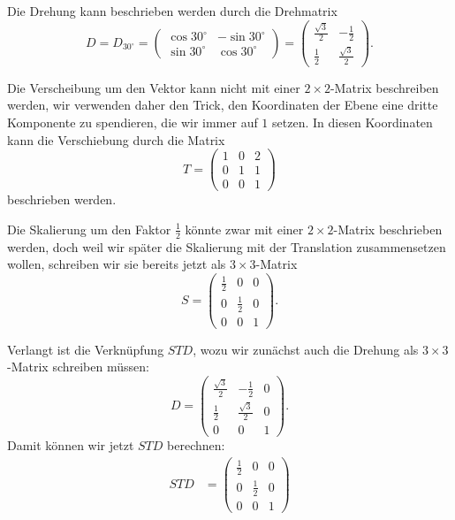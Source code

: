 \begin{loesung}
\begin{teilaufgaben}
\item
Die Drehung kann beschrieben werden durch die Drehmatrix
\[
D=D_{30^\circ}
=
\begin{pmatrix}
\cos 30^\circ & -\sin 30^\circ \\
\sin 30^\circ &  \cos 30^\circ
\end{pmatrix}
=
\begin{pmatrix}
\frac{\sqrt{3}}2 & - \frac12\\
\frac12 & \frac{\sqrt{3}}2
\end{pmatrix}.
\]
\item
Die Verscheibung um den Vektor kann nicht mit einer $2\times 2$-Matrix
beschreiben werden, wir verwenden daher den Trick, den Koordinaten der
Ebene eine dritte Komponente zu spendieren, die wir immer auf $1$ setzen.
In diesen Koordinaten kann die Verschiebung durch die Matrix
\[
T=
\begin{pmatrix}
1&0&2\\
0&1&1\\
0&0&1
\end{pmatrix}
\]
beschrieben werden.
\item
Die Skalierung um den Faktor $\frac12$ könnte zwar mit einer $2\times 2$-Matrix
beschrieben werden, doch weil wir später die Skalierung mit der Translation
zusammensetzen wollen, schreiben wir sie bereits jetzt als $3\times 3$-Matrix
\[
S
=
\begin{pmatrix}
\frac12 &     0   & 0 \\
    0   & \frac12 & 0 \\
    0   &     0   & 1 
\end{pmatrix}
.
\]
\item
Verlangt ist die Verknüpfung $STD$, wozu wir zunächst auch die Drehung als
$3\times 3$-Matrix schreiben müssen:
\[
D =
\begin{pmatrix}
\frac{\sqrt{3}}2 & - \frac12        & 0 \\
\frac12          & \frac{\sqrt{3}}2 & 0 \\
      0          &        0         & 1
\end{pmatrix}
.
\]
Damit können wir jetzt $STD$ berechnen:
\begin{align*}
STD
&=
\begin{pmatrix}
\frac12 &     0   & 0 \\
    0   & \frac12 & 0 \\
    0   &     0   & 1 
\end{pmatrix}

\end{align*}
\end{teilaufgaben}
\end{loesung}
